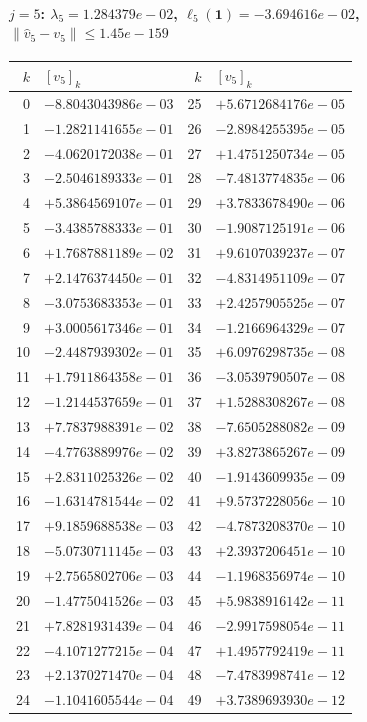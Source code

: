 \documentclass[11pt]{article}
\begin{document}
\paragraph{$j = 5$: $\lambda_{5} = 1.284379e-02$, \quad $\ell_{5}(\mathbf{1}) = -3.694616e-02$, \quad $\|\hat v_{5} - v_{5}\| \leq 1.45e-159$}
\begin{center}
{\footnotesize
\begin{tabular}{r@{\;\;}l@{\quad}r@{\;\;}l}
\toprule
$k$ & $[v_{5}]_k$ & $k$ & $[v_{5}]_k$ \\
\midrule
0 & $-8.8043043986e-03$ & 25 & $+5.6712684176e-05$ \\
1 & $-1.2821141655e-01$ & 26 & $-2.8984255395e-05$ \\
2 & $-4.0620172038e-01$ & 27 & $+1.4751250734e-05$ \\
3 & $-2.5046189333e-01$ & 28 & $-7.4813774835e-06$ \\
4 & $+5.3864569107e-01$ & 29 & $+3.7833678490e-06$ \\
5 & $-3.4385788333e-01$ & 30 & $-1.9087125191e-06$ \\
6 & $+1.7687881189e-02$ & 31 & $+9.6107039237e-07$ \\
7 & $+2.1476374450e-01$ & 32 & $-4.8314951109e-07$ \\
8 & $-3.0753683353e-01$ & 33 & $+2.4257905525e-07$ \\
9 & $+3.0005617346e-01$ & 34 & $-1.2166964329e-07$ \\
10 & $-2.4487939302e-01$ & 35 & $+6.0976298735e-08$ \\
11 & $+1.7911864358e-01$ & 36 & $-3.0539790507e-08$ \\
12 & $-1.2144537659e-01$ & 37 & $+1.5288308267e-08$ \\
13 & $+7.7837988391e-02$ & 38 & $-7.6505288082e-09$ \\
14 & $-4.7763889976e-02$ & 39 & $+3.8273865267e-09$ \\
15 & $+2.8311025326e-02$ & 40 & $-1.9143609935e-09$ \\
16 & $-1.6314781544e-02$ & 41 & $+9.5737228056e-10$ \\
17 & $+9.1859688538e-03$ & 42 & $-4.7873208370e-10$ \\
18 & $-5.0730711145e-03$ & 43 & $+2.3937206451e-10$ \\
19 & $+2.7565802706e-03$ & 44 & $-1.1968356974e-10$ \\
20 & $-1.4775041526e-03$ & 45 & $+5.9838916142e-11$ \\
21 & $+7.8281931439e-04$ & 46 & $-2.9917598054e-11$ \\
22 & $-4.1071277215e-04$ & 47 & $+1.4957792419e-11$ \\
23 & $+2.1370271470e-04$ & 48 & $-7.4783998741e-12$ \\
24 & $-1.1041605544e-04$ & 49 & $+3.7389693930e-12$ \\
\bottomrule
\end{tabular}
}
\end{center}
\end{document}
